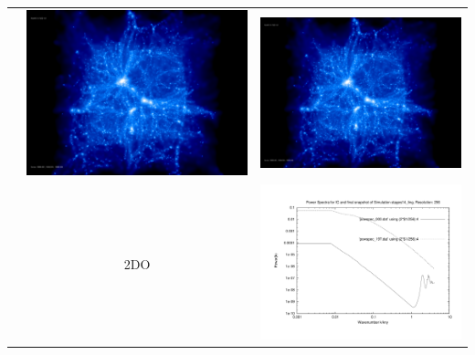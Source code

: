 \documentclass[a4paper,11pt,fleqn,oneside]{book}
\begin{document}
\begin{itemize}
\begin{table}[p]
\begin{tabular}{l|c|c}
 & \includegraphics[scale=0.075]{r256/h100/stages14_ling/197.jpg} & \includegraphics[scale=0.075]{r256/h100/stages14_ling/197.jpg} \\
 & 2DO & \includegraphics[scale=0.25]{r256/h100/stages14_ling/plot_powspec_stages14_ling.pdf} \\

\end{tabular}
\end{table}
\end{itemize}
\end{document}
